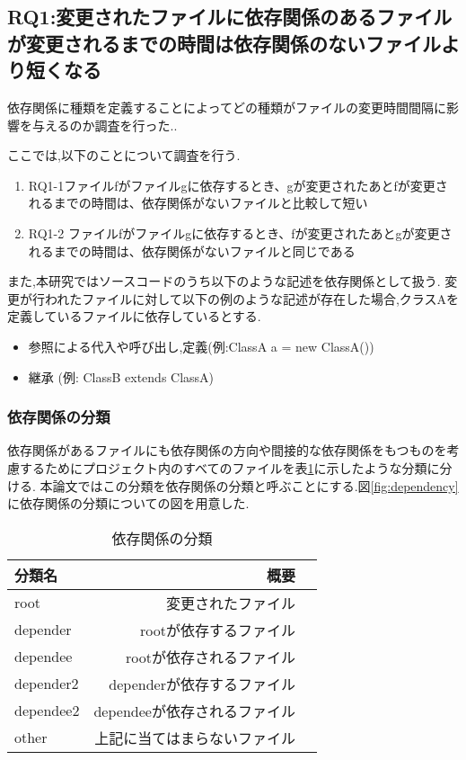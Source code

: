 \documentclass[submit,ses,noauthor]{ipsj} %
\begin{document}
\subsection{RQ1:変更されたファイルに依存関係のあるファイルが変更されるまでの時間は依存関係のないファイルより短くなる}
依存関係に種類を定義することによってどの種類がファイルの変更時間間隔に影響を与えるのか調査を行った..

ここでは,以下のことについて調査を行う.
\begin{enumerate}
\item RQ1-1ファイルfがファイルgに依存するとき、gが変更されたあとfが変更されるまでの時間は、依存関係がないファイルと比較して短い
\item RQ1-2 ファイルfがファイルgに依存するとき、fが変更されたあとgが変更されるまでの時間は、依存関係がないファイルと同じである
\end{enumerate}

また,本研究ではソースコードのうち以下のような記述を依存関係として扱う.
変更が行われたファイルに対して以下の例のような記述が存在した場合,クラスAを定義しているファイルに依存しているとする.

\begin{itemize}
\item 参照による代入や呼び出し,定義(例:ClassA a = new ClassA())
\item 継承 (例: ClassB extends ClassA)
\end{itemize}

\subsubsection{依存関係の分類}
依存関係があるファイルにも依存関係の方向や間接的な依存関係をもつものを考慮するためにプロジェクト内のすべてのファイルを表\ref{tab:依存関係の分類}に示したような分類に分ける.
本論文ではこの分類を依存関係の分類と呼ぶことにする.図\ref{fig:dependency}に依存関係の分類についての図を用意した.

\begin{table}
\caption{依存関係の分類}
\begin{tabular}{|l|r|r|} \hline
分類名 & 概要 \\ \hline
root & 変更されたファイル \\ \hline
depender & rootが依存するファイル \\ \hline
dependee & rootが依存されるファイル \\ \hline
depender2 & dependerが依存するファイル \\ \hline
dependee2 & dependeeが依存されるファイル \\ \hline
other & 上記に当てはまらないファイル \\ \hline
\end{tabular}
\label{tab:依存関係の分類}
\end{table}
\end{document}
